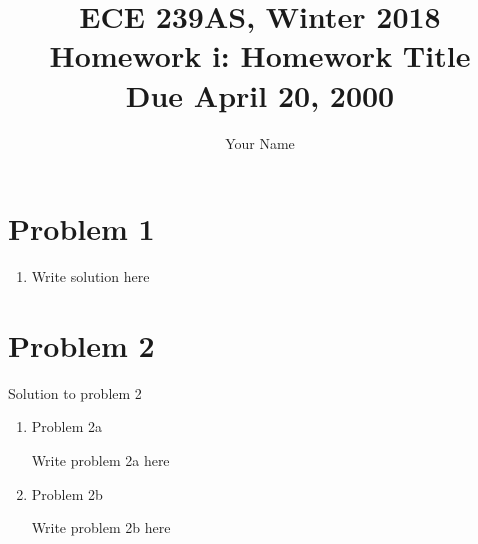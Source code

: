 \documentclass[11pt]{article}
\newcommand{\cnum}{ECE 239AS}
\newcommand{\ced}{Winter 2018}
\newcommand{\ctitle}[3]{\title{\vspace{-0.5in}\cnum, \ced\\Homework #1: #2\\Due #3}}
\newcommand{\solution}[1]{{{\color{blue}{\bf Solution:} {#1}}}}
\begin{document}
\ctitle{i}{Homework Title}{April 20, 2000}
\author{Your Name}
\date{}
\maketitle
\vspace{-0.75in}

\section{Problem 1}
\begin{enumerate}
\item 

\solution{
Write solution here
}

\vspace{10cm}
\end{enumerate}

\newpage
\section{Problem 2}

\solution{Solution to problem 2}
\begin{enumerate}
\item Problem 2a

\solution{
Write problem 2a here
}

\vspace{2cm}
\item Problem 2b

\solution{
Write problem 2b here  
}

\end{enumerate}
\end{document}
